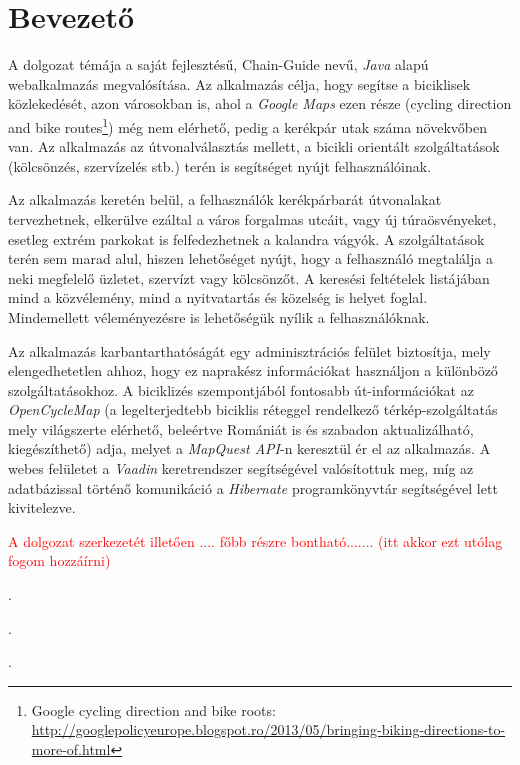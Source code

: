 \chapter{Bevezető}\label{ch:BEVEZET}


\setlength{\parindent}{4em}
\setlength{\parskip}{1em}

 \par	A dolgozat témája a saját fejlesztésű,  Chain-Guide nevű,   \textit{Java} alapú webalkalmazás megvalósítása. Az alkalmazás célja, hogy segítse a biciklisek közlekedését, azon városokban is, ahol a  \textit{Google Maps} ezen része  (cycling direction and bike %
  routes\footnote{Google cycling direction and bike roots: \\ \href{http://googlepolicyeurope.blogspot.ro/2013/05/bringing-biking-directions-to-more-of.html}{http://googlepolicyeurope.blogspot.ro/2013/05/bringing-biking-directions-to-more-of.html}}) még nem elérhető, pedig a kerékpár utak száma növekvőben van. Az alkalmazás az útvonalválasztás mellett, a bicikli orientált szolgáltatások (kölcsönzés, szervízelés stb.) terén is segítséget nyújt felhasználóinak. 
 \par	Az alkalmazás keretén belül, a felhasználók kerékpárbarát útvonalakat tervezhetnek, elkerülve ezáltal a város forgalmas utcáit, vagy  új túraösvényeket, esetleg extrém parkokat is felfedezhetnek a kalandra vágyók. A szolgáltatások terén sem marad alul, hiszen lehetőséget nyújt, hogy a felhasználó megtalálja a neki megfelelő üzletet, szervízt vagy kölcsönzőt. A keresési feltételek listájában mind a közvélemény, mind a nyitvatartás és közelség is helyet foglal. Mindemellett véleményezésre is lehetőségük nyílik a felhasználóknak. 
 \par	Az alkalmazás  karbantarthatóságát egy adminisztrációs felület biztosítja, mely elengedhetetlen ahhoz, hogy ez naprakész információkat használjon a különböző szolgáltatásokhoz. A biciklizés szempontjából fontosabb út-információkat az  \textit{OpenCycleMap} \cite{OpenCycleMap} (a legelterjedtebb biciklis réteggel rendelkező térkép-szolgáltatás mely világszerte elérhető, beleértve Romániát is és szabadon aktualizálható, kiegészíthető) adja, melyet a  \textit{MapQuest API}-n \cite{MapQuestJsApi} keresztül ér el az alkalmazás. A webes felületet a  \textit{Vaadin} \cite{Vaadin}  keretrendszer segítségével valósítottuk meg, míg az adatbázissal történő komunikáció a  \textit{Hibernate} \cite{Hibernate} programkönyvtár segítségével lett kivitelezve. 
 \par	\textcolor{red}{A dolgozat szerkezetét illetően .... főbb részre bontható.......
		(itt akkor ezt utólag fogom hozzáírni)}
\par .
\par.
\par .





